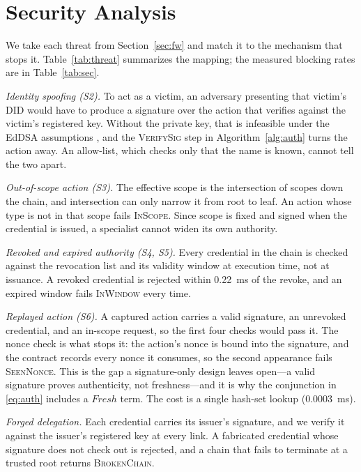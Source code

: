 \documentclass[conference]{IEEEtran}
\begin{document}
\section{Security Analysis}\label{sec:sec}
We take each threat from Section~\ref{sec:fw} and match it to the mechanism that stops it. Table~\ref{tab:threat} summarizes the mapping; the measured blocking rates are in Table~\ref{tab:sec}.

\textit{Identity spoofing (S2).} To act as a victim, an adversary presenting that victim's DID would have to produce a signature over the action that verifies against the victim's registered key. Without the private key, that is infeasible under the EdDSA assumptions \cite{ed25519,rfc8032}, and the \textsc{VerifySig} step in Algorithm~\ref{alg:auth} turns the action away. An allow-list, which checks only that the name is known, cannot tell the two apart.

\textit{Out-of-scope action (S3).} The effective scope is the intersection of scopes down the chain, and intersection can only narrow it from root to leaf. An action whose type is not in that scope fails \textsc{InScope}. Since scope is fixed and signed when the credential is issued, a specialist cannot widen its own authority.

\textit{Revoked and expired authority (S4, S5).} Every credential in the chain is checked against the revocation list and its validity window at execution time, not at issuance. A revoked credential is rejected within 0.22~ms of the revoke, and an expired window fails \textsc{InWindow} every time.

\textit{Replayed action (S6).} A captured action carries a valid signature, an unrevoked credential, and an in-scope request, so the first four checks would pass it. The nonce check is what stops it: the action's nonce is bound into the signature, and the contract records every nonce it consumes, so the second appearance fails \textsc{SeenNonce}. This is the gap a signature-only design leaves open---a valid signature proves authenticity, not freshness---and it is why the conjunction in \eqref{eq:auth} includes a $\mathit{Fresh}$ term. The cost is a single hash-set lookup (0.0003~ms).

\textit{Forged delegation.} Each credential carries its issuer's signature, and we verify it against the issuer's registered key at every link. A fabricated credential whose signature does not check out is rejected, and a chain that fails to terminate at a trusted root returns \textsc{BrokenChain}.
\end{document}
